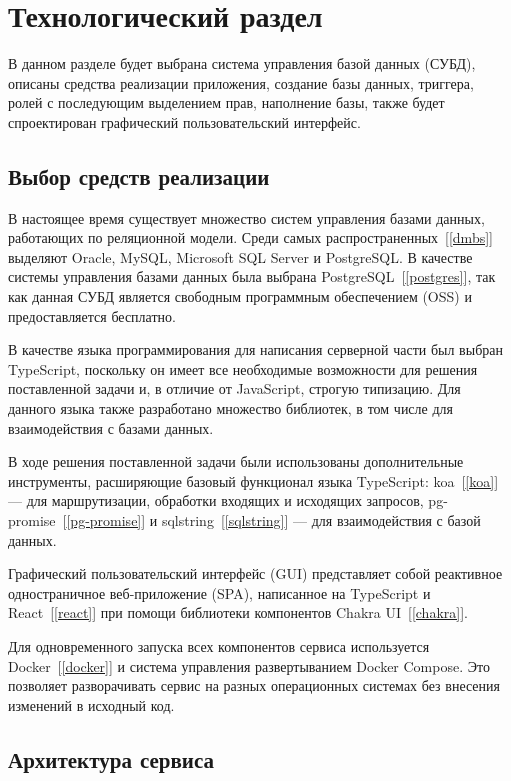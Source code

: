 \chapter{Технологический раздел}

В данном разделе будет выбрана система управления базой данных (СУБД), описаны средства реализации приложения, создание базы данных, триггера, ролей с последующим выделением прав, наполнение базы, также будет спроектирован графический пользовательский интерфейс.

\section{Выбор средств реализации}

В настоящее время существует множество систем управления базами данных, работающих по реляционной модели. Среди самых распространенных~[\ref{dmbs}] выделяют Oracle, MySQL, Microsoft SQL Server и PostgreSQL. В качестве системы управления базами данных была выбрана PostgreSQL~[\ref{postgres}], так как данная СУБД является свободным программным обеспечением (OSS) и предоставляется бесплатно.

В качестве языка программирования для написания серверной части был выбран TypeScript, поскольку он имеет все необходимые возможности для решения поставленной задачи и, в отличие от JavaScript, строгую типизацию. Для данного языка также разработано множество библиотек, в том числе для взаимодействия с базами данных.

В ходе решения поставленной задачи были использованы дополнительные инструменты, расширяющие базовый функционал языка TypeScript: koa~[\ref{koa}] --- для маршрутизации, обработки входящих и исходящих запросов, pg-promise~[\ref{pg-promise}] и sqlstring~[\ref{sqlstring}] --- для взаимодействия с базой данных.

Графический пользовательский интерфейс (GUI) представляет собой реактивное одностраничное веб-приложение (SPA), написанное на TypeScript и React~[\ref{react}] при помощи библиотеки компонентов Chakra UI~[\ref{chakra}].

Для одновременного запуска всех компонентов сервиса используется Docker~[\ref{docker}] и система управления развертыванием Docker Compose. Это позволяет разворачивать сервис на разных операционных системах без внесения изменений в исходный код.

\pagebreak
\section{Архитектура сервиса}

